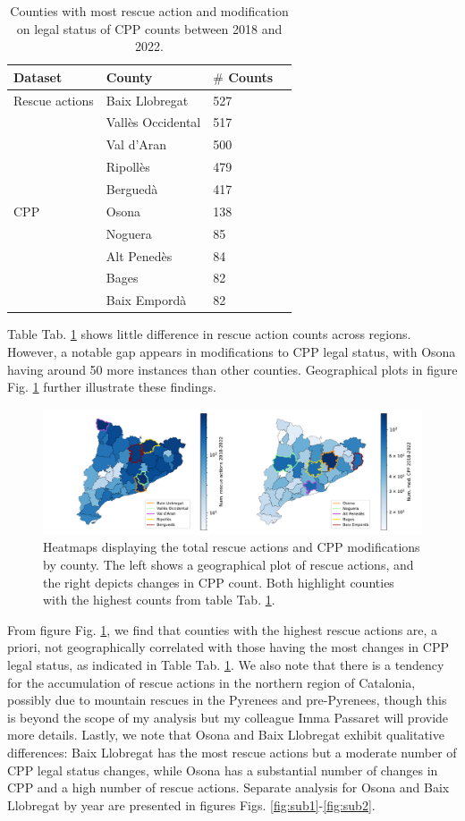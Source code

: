 \documentclass[
  journal=small,
  manuscript=mini-article,  %
  year=2023,
  volume=1,
]{odj-journal}
\begin{document}
\begin{longtable}{p{2.5cm}p{2.5cm}p{2.5cm}p{2.5cm}}
  \caption{Counties with most rescue action and modification on legal status of CPP counts between 2018 and 2022.}\label{tab:tab1}\\
  \toprule
  \textbf{Dataset} & \textbf{County} & \textbf{$\#$ Counts} \\
  \midrule
  \endhead
  \midrule
  \endfoot
  Rescue actions & Baix Llobregat & 527 \\
   & Vallès Occidental & 517 \\
   & Val d'Aran & 500 \\
   & Ripollès & 479 \\
   & Berguedà & 417 \\
  \midrule
  CPP & Osona & 138 \\
   & Noguera & 85 \\
   & Alt Penedès & 84 \\
   & Bages & 82 \\
   & Baix Empordà & 82 \\
  \bottomrule
\end{longtable}
Table Tab. \ref{tab:tab1} shows little difference in rescue action counts across regions. However, a notable gap appears in modifications to CPP legal status, with Osona having around 50 more instances than other counties. Geographical plots in figure Fig. \ref{fig:fig1} further illustrate these findings.

\begin{figure}[hbt!]
\centering
\includegraphics[width=1\linewidth]{../figures/merged_maps_plot}
\caption{Heatmaps displaying the total rescue actions and CPP modifications by county. The left shows a geographical plot of rescue actions, and the right depicts changes in CPP count. Both highlight counties with the highest counts from table Tab. \ref{tab:tab1}.}
\label{fig:fig1}
\end{figure}
From figure Fig. \ref{fig:fig1}, we find that counties with the highest rescue actions are, a priori, not geographically correlated with those having the most changes in CPP legal status, as indicated in Table Tab. \ref{tab:tab1}. We also note that there is a tendency for the accumulation of rescue actions in the northern region of Catalonia, possibly due to mountain rescues in the Pyrenees and pre-Pyrenees, though this is beyond the scope of my analysis but my colleague Imma Passaret will provide more details. Lastly, we note that Osona and Baix Llobregat exhibit qualitative differences: Baix Llobregat has the most rescue actions but a moderate number of CPP legal status changes, while Osona has a substantial number of changes in CPP and a high number of rescue actions. Separate analysis for Osona and Baix Llobregat by year are presented in figures Figs. \ref{fig:sub1}-\ref{fig:sub2}.
\end{document}
